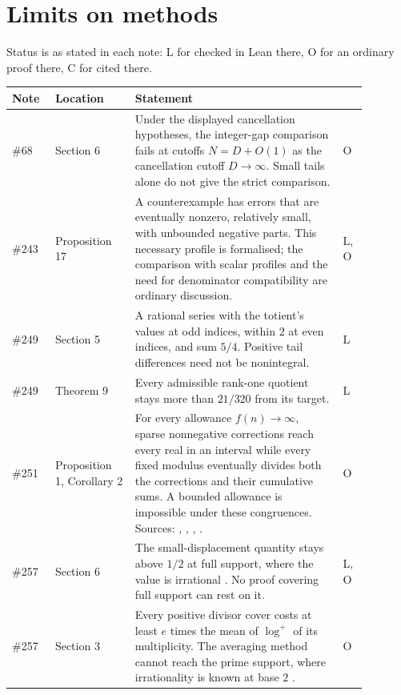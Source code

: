 \documentclass[11pt]{article}
\begin{document}
\section{Limits on methods}\label{sec:second}\label{sec:inventory}


Status is as stated in each note: L for checked in Lean there, O for an
ordinary proof there, C for cited there.

\begin{longtable}{p{0.10\linewidth}p{0.20\linewidth}p{0.52\linewidth}p{0.06\linewidth}}
\hline
Note & Location & Statement & \\
\hline
\#68 \cite{plectis68} & Section 6 & Under the displayed cancellation hypotheses, the integer-gap comparison fails at cutoffs $N=D+O(1)$ as the cancellation cutoff $D\to\infty$.  Small tails alone do not give the strict comparison. & O \\
\#243 \cite{plectis243} & Proposition 17 & A counterexample has errors that are eventually nonzero, relatively small, with unbounded negative parts.  This necessary profile is formalised; the comparison with scalar profiles and the need for denominator compatibility are ordinary discussion. & L, O \\
\#249 \cite{plectis249} & Section 5 & A rational series with the totient's values at odd indices, within $2$ at even indices, and sum $5/4$.  Positive tail differences need not be nonintegral. & L \\
\#249 \cite{plectis249} & Theorem 9 & Every admissible rank-one quotient stays more than $21/320$ from its target. & L \\
\#251 \cite{plectis251} & Proposition 1, Corollary 2 & For every allowance $f(n)\to\infty$, sparse nonnegative corrections reach every real in an interval while every fixed modulus eventually divides both the corrections and their cumulative sums.  A bounded allowance is impossible under these congruences.  Sources: \cite{fridy1966}, \cite[Lemma~4]{crmarickovac2025}, \cite[Lemma~5.1]{kovactao2024}, \cite{vandoornkovac2025}. & O \\
\#257 \cite{plectis257} & Section 6 & The small-displacement quantity stays above $1/2$ at full support, where the value is irrational \cite{erdos1948}.  No proof covering full support can rest on it. & L, O \\
\#257 \cite{plectis257} & Section 3 & Every positive divisor cover costs at least $e$ times the mean of $\log^+$ of its multiplicity.  The averaging method cannot reach the prime support, where irrationality is known at base $2$ \cite{taoteravainen2025}. & O \\

\end{longtable}
\end{document}
